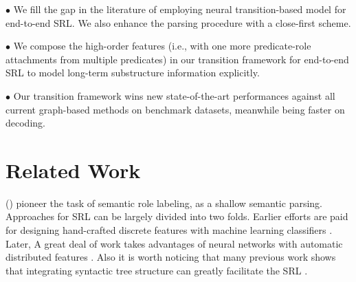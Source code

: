 \documentclass[letterpaper]{article} %
\begin{document}
\begin{CJK}{UTF8}{gbsn}
$\bullet$ We fill the gap in the literature of employing neural transition-based model for end-to-end SRL.
We also enhance the parsing procedure with a close-first scheme.


$\bullet$ We compose the high-order features (i.e., with one more predicate-role attachments from multiple predicates) in our transition framework for end-to-end SRL to model long-term substructure information explicitly.


$\bullet$ Our transition framework wins new state-of-the-art performances against all current graph-based methods on benchmark datasets, meanwhile being faster on decoding.




















\section{Related Work}



\citeauthor{gildea-jurafsky-2000-automatic} (\citeyear{gildea-jurafsky-2000-automatic}) pioneer the task of semantic role labeling, as a shallow semantic parsing.
Approaches for SRL can be largely divided into two folds.
Earlier efforts are paid for designing hand-crafted discrete features with machine learning classifiers \cite{pradhan-etal-2005-semantic,PunyakanokRY08,zhao-etal-2009-multilingual-dependency}.
Later, A great deal of work takes advantages of neural networks with automatic distributed features \cite{fitzgerald-etal-2015-semantic,roth-lapata-2016-neural,marcheggiani-titov-2017-encoding,strubell-etal-2018-linguistically,Fei06295}.
Also it is worth noticing that many previous work shows that integrating syntactic tree structure can greatly facilitate the SRL \cite{marcheggiani-etal-2017-simple,zhang-etal-2019-syntax-enhanced,Crossfei9165903}.



\end{CJK}
\end{document}
